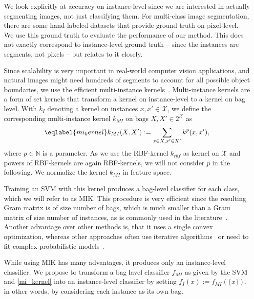 We look explicitly at accuracy on instance-level since we are interested in
actually segmenting images, not just classifying them. For multi-class image
segmentation, there are some hand-labeled datasets that provide ground truth
on pixel-level. We use this ground truth to evaluate the performance of our
method. This does not exactly correspond to instance-level ground truth --
since the instances are segments, not pixels -- but relates to it closely.

Since scalability is very important in real-world computer vision
applications, and natural images might need hundreds of segments to
account for all possible object boundaries, we use the efficient
multi-instance kernels~\cite{graetner2002multi}.
Multi-instance kernels are a form of set kernels that transform a kernel
on instance-level to a kernel on bag level.
With $k_I$ denoting a kernel on instances $x,x' \in \mathcal{X}$, we define the
corresponding multi-instance kernel $k_{MI}$ on bags $X,X' \in 2^\mathcal{X}$
as 
\vspace{-2mm}
\begin{equation}
    \eqlabel{mi_kernel}
    k_{MI}(X,X') := \sum_{x \in X, x' \in X'} k^p(x,x'),
\vspace{-2.5mm}
\end{equation}
where $p \in \mathbb{N}$ is a parameter.  As we use the RBF-kernel
$k_{rbf}$ as kernel on $\mathcal{X}$ and powers of RBF-kernels are again
RBF-kernels, we will not consider $p$ in the following.
We normalize the kernel $k_{MI}$ in feature space.

Training an SVM with this kernel produces a bag-level classifier for each class, which we will refer to as MIK.
This procedure is very efficient since the resulting Gram matrix is of size
number of bags, which is much smaller than a Gram matrix of size number of
instances, as is commonly used in the
literature~\cite{andrews2003support,nguyen2010new,zhang2008m3miml}.  Another
advantage over other methods is, that it uses a single convex optimization,
whereas other approaches often use iterative algorithms~\cite{andrews2003support} or need to fit complex
probabilistic models~\cite{zha2008joint}.

While using MIK has many advantages, it produces only an instance-level
classifier. We propose to transform a bag lavel classifier $f_{MI}$ as given by
the SVM and \eqref{mi_kernel} into an instance-level classifier by setting
$f_{I}(x):=f_{MI}(\{x\})$, in other words, by considering each instance as its own
bag. 

